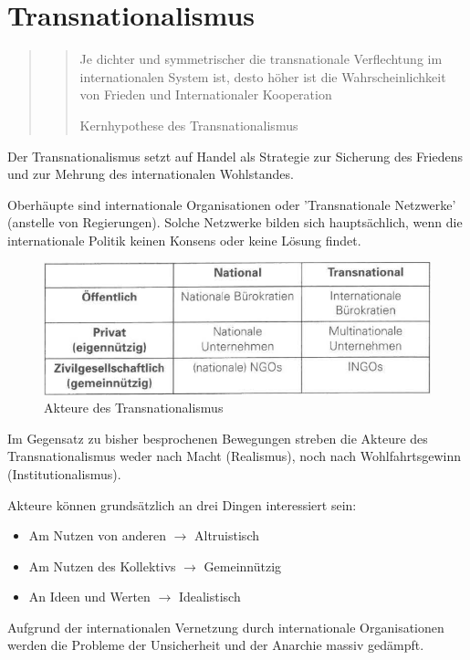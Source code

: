\documentclass[a4paper, 11pt]{article}
\begin{document}
\section{Transnationalismus}
\begin{quote}
	\blockquote[Kernhypothese des Transnationalismus]{Je dichter und symmetrischer die transnationale Verflechtung im internationalen System ist, desto höher ist die Wahrscheinlichkeit von Frieden und Internationaler Kooperation}
\end{quote}


Der Transnationalismus setzt auf Handel als Strategie zur Sicherung des Friedens und zur Mehrung des internationalen Wohlstandes.

Oberhäupte sind internationale Organisationen oder 'Transnationale Netzwerke' (anstelle von Regierungen). Solche Netzwerke bilden sich hauptsächlich, wenn die internationale Politik keinen Konsens oder keine Lösung findet. 

\begin{figure}[htb]
	\centering
	\includegraphics[keepaspectratio=true,height=10\baselineskip]{akteureTransnationalismus.png}
	\caption{Akteure des Transnationalismus}
	\label{fig:akteureTransnationalismus}
\end{figure}

\noindent Im Gegensatz zu bisher besprochenen Bewegungen streben die Akteure des Transnationalismus weder nach Macht (Realismus), noch nach Wohlfahrtsgewinn (Institutionalismus). 

Akteure können grundsätzlich an drei Dingen interessiert sein:

\begin{itemize}
	\item Am Nutzen von anderen $\rightarrow$ Altruistisch
	\item Am Nutzen des Kollektivs $\rightarrow$ Gemeinnützig
	\item An Ideen und Werten $\rightarrow$ Idealistisch
\end{itemize}

\noindent Aufgrund der internationalen Vernetzung durch internationale Organisationen werden die Probleme der Unsicherheit und der Anarchie massiv gedämpft.
\end{document}
